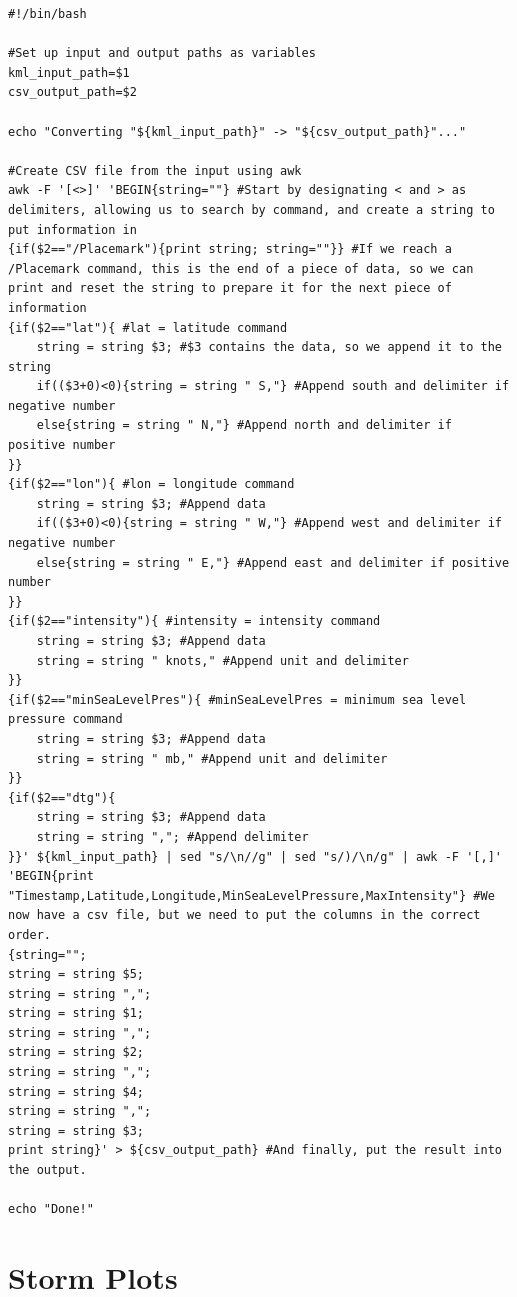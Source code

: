 \documentclass[]{article}
\begin{document}
\begin{lstlisting}[caption=Script to create a CSV file using an input KML file]
#!/bin/bash

#Set up input and output paths as variables
kml_input_path=$1
csv_output_path=$2

echo "Converting "${kml_input_path}" -> "${csv_output_path}"..."

#Create CSV file from the input using awk
awk -F '[<>]' 'BEGIN{string=""} #Start by designating < and > as delimiters, allowing us to search by command, and create a string to put information in
{if($2=="/Placemark"){print string; string=""}} #If we reach a /Placemark command, this is the end of a piece of data, so we can print and reset the string to prepare it for the next piece of information
{if($2=="lat"){ #lat = latitude command
    string = string $3; #$3 contains the data, so we append it to the string
    if(($3+0)<0){string = string " S,"} #Append south and delimiter if negative number
    else{string = string " N,"} #Append north and delimiter if positive number
}}
{if($2=="lon"){ #lon = longitude command
    string = string $3; #Append data
    if(($3+0)<0){string = string " W,"} #Append west and delimiter if negative number
    else{string = string " E,"} #Append east and delimiter if positive number
}}
{if($2=="intensity"){ #intensity = intensity command
    string = string $3; #Append data
    string = string " knots," #Append unit and delimiter
}}
{if($2=="minSeaLevelPres"){ #minSeaLevelPres = minimum sea level pressure command
    string = string $3; #Append data
    string = string " mb," #Append unit and delimiter
}}
{if($2=="dtg"){
    string = string $3; #Append data
    string = string ","; #Append delimiter
}}' ${kml_input_path} | sed "s/\n//g" | sed "s/)/\n/g" | awk -F '[,]' 'BEGIN{print "Timestamp,Latitude,Longitude,MinSeaLevelPressure,MaxIntensity"} #We now have a csv file, but we need to put the columns in the correct order.
{string="";
string = string $5;
string = string ",";
string = string $1;
string = string ",";
string = string $2;
string = string ",";
string = string $4;
string = string ",";
string = string $3;
print string}' > ${csv_output_path} #And finally, put the result into the output.

echo "Done!"
\end{lstlisting}

\newpage

\section{Storm Plots}
\end{document}
